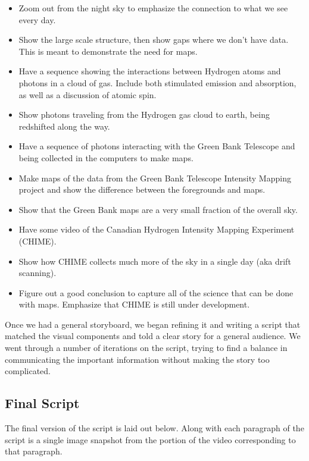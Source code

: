\begin{itemize}
\item Zoom out from the night sky to emphasize the connection to what we see every day.
\item Show the large scale structure, then show gaps where we don't have data. This is meant to demonstrate the need for \cm maps.
\item Have a sequence showing the interactions between Hydrogen atoms and \cm photons in a cloud of gas. Include both stimulated emission and absorption, as well as a discussion of atomic spin.
\item Show photons traveling from the Hydrogen gas cloud to earth, being redshifted along the way. 
\item Have a sequence of photons interacting with the Green Bank Telescope and being collected in the computers to make maps.
\item Make maps of the data from the Green Bank Telescope Intensity Mapping project and show the difference between the foregrounds and \cm maps. 
\item Show that the Green Bank maps are a very small fraction of the overall sky.
\item Have some video of the Canadian Hydrogen Intensity Mapping Experiment (CHIME).
\item Show how CHIME collects much more of the sky in a single day (aka drift scanning). 
\item Figure out a good conclusion to capture all of the science that can be done with \cm maps. Emphasize that CHIME is still under development. 
\end{itemize}

Once we had a general storyboard, we began refining it and writing a script that matched the visual components and told a clear story for a general audience. We went through a number of iterations on the script, trying to find a balance in communicating the important information without making the story too complicated. 


\subsection{Final Script}

The final version of the script is laid out below. Along with each paragraph of the script is a single image snapshot from the portion of the video corresponding to that paragraph. 


